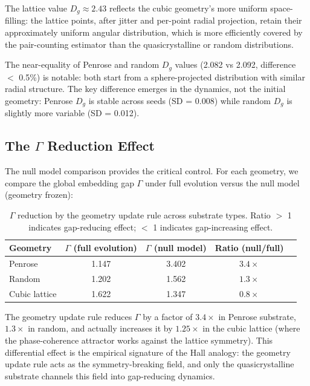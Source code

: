 \documentclass[11pt,a4paper]{article}
\begin{document}
The lattice value $D_g \approx 2.43$ reflects the cubic geometry's more uniform space-filling: the lattice points, after jitter and per-point radial projection, retain their approximately uniform angular distribution, which is more efficiently covered by the pair-counting estimator than the quasicrystalline or random distributions.

The near-equality of Penrose and random $D_g$ values (2.082 vs 2.092, difference $<$ 0.5\%) is notable: both start from a sphere-projected distribution with similar radial structure. The key difference emerges in the dynamics, not the initial geometry: Penrose $D_g$ is stable across seeds (SD = 0.008) while random $D_g$ is slightly more variable (SD = 0.012).

\subsection{The $\Gamma$ Reduction Effect}

The null model comparison provides the critical control. For each geometry, we compare the global embedding gap $\Gamma$ under full evolution versus the null model (geometry frozen):

\begin{table}[htbp]
\centering
\begin{tabular}{lcccc}
\toprule
\textbf{Geometry} & \textbf{$\Gamma$ (full evolution)} & \textbf{$\Gamma$ (null model)} & \textbf{Ratio (null/full)} \\
\midrule
Penrose & 1.147 & 3.402 & $3.4\times$ \\
Random & 1.202 & 1.562 & $1.3\times$ \\
Cubic lattice & 1.622 & 1.347 & $0.8\times$ \\
\bottomrule
\end{tabular}
\caption{$\Gamma$ reduction by the geometry update rule across substrate types. Ratio $>$ 1 indicates gap-reducing effect; $<$ 1 indicates gap-increasing effect.}
\end{table}

The geometry update rule reduces $\Gamma$ by a factor of $3.4\times$ in Penrose substrate, $1.3\times$ in random, and actually increases it by $1.25\times$ in the cubic lattice (where the phase-coherence attractor works against the lattice symmetry). This differential effect is the empirical signature of the Hall analogy: the geometry update rule acts as the symmetry-breaking field, and only the quasicrystalline substrate channels this field into gap-reducing dynamics.
\end{document}
